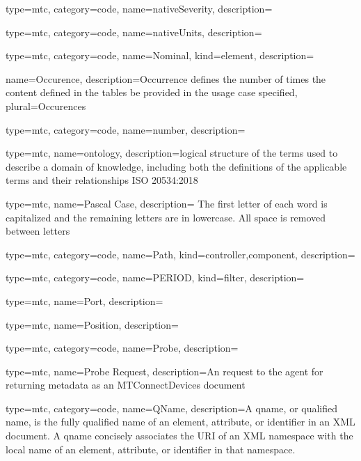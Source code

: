 {
  type=mtc,
  category=code,
  name={nativeSeverity},
  description={}
}


{
  type=mtc,
  category=code,
  name={nativeUnits},
  description={}
}



{
  type=mtc,
  category=code,
  name={Nominal},
  kind={element},
  description={}
}


{
  name={Occurence},
  description={Occurrence defines the number of times the content defined in the tables \MAY be provided in the usage case specified},
  plural={Occurences}
}


{
  type=mtc,
  category=code,
  name={number},
  description={}
}


{
  type=mtc,
  name=ontology,
  description={logical structure of the terms used to describe a domain of knowledge, including both the definitions of the applicable terms and their relationships ISO 20534:2018}
}


{
  type=mtc,
  name={Pascal Case},
  description= {The first letter of each word is capitalized and the remaining letters are in lowercase. All space is removed between letters}
}


{
  type=mtc,
  category=code,
  name={Path},
  kind={controller,component},
  description= {}
}


{
  type=mtc,
  category=code,
  name={PERIOD},
  kind={filter},
  description={}
}


{
  type=mtc,
  name={Port},
  description={}
}


{
  type=mtc,
  name={Position},
  description={}
}


{
  type=mtc,
  category=code,
  name={Probe},
  description={}
}


{
  type=mtc,
  name={Probe Request},
  description={An  request to the \gls{agent} for returning metadata as an MTConnectDevices  document}
}


{
  type=mtc,
  category=code,
  name={QName},
  description={A \gls{qname}, or qualified name, is the fully qualified name of an element, attribute, or identifier in an XML document. A  \gls{qname} concisely associates the URI of an XML namespace with the local name of an element, attribute, or identifier in that namespace.}
}


